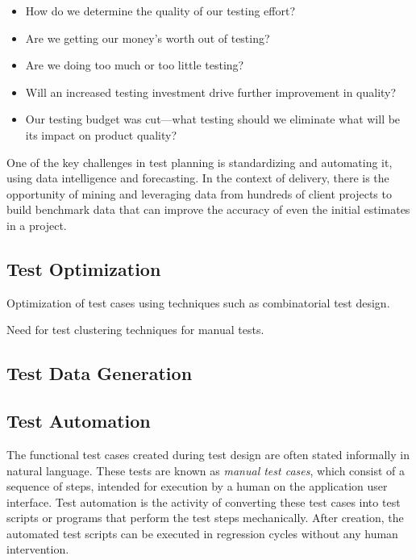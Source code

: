 \begin{itemize}
\denseitems

\item How do we determine the quality of our testing effort?

\item Are we getting our money's worth out of testing?

\item Are we doing too much or too little testing?

\item Will an increased testing investment drive further improvement in quality?

\item Our testing budget was cut---what testing should we eliminate what will be
  its impact on product quality?

\end{itemize}

One of the key challenges in test planning is standardizing and automating it,
using data intelligence and forecasting. In the context of delivery, there is
the opportunity of mining and leveraging data from hundreds of client projects
to build benchmark data that can improve the accuracy of even the initial
estimates in a project.

\subsection{Test Optimization}
\label{sec:test-design}

Optimization of test cases using techniques such as combinatorial test design.

Need for test clustering techniques for manual tests.

\subsection{Test Data Generation}
\label{sec:test-data}



\subsection{Test Automation}
\label{sec:test-automation}

The functional test cases created during test design are often stated informally
in natural language. These tests are known as \textit{manual test cases}, which
consist of a sequence of steps, intended for execution by a human on the
application user interface.  Test automation is the activity of converting these
test cases into test scripts or programs that perform the test steps
mechanically. After creation, the automated test scripts can be executed in
regression cycles without any human intervention.

